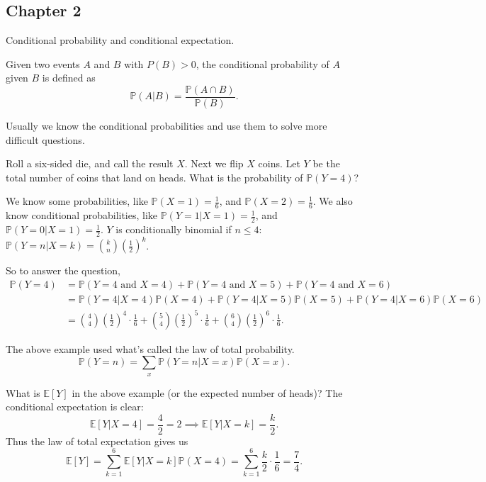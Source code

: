 \documentclass{article}
\newcommand{\PP}{\mathbb{P}}
\newcommand{\E}{\mathbb{E}}
\begin{document}
\subsection{Chapter 2}
Conditional probability and conditional expectation.
\begin{definition}
  Given two events \(A\) and \(B\) with \(P(B) > 0\), the conditional probability of \(A\) given \(B\) is defined as
  \[\PP(A|B) = \frac{\PP(A \cap B)}{\PP(B)}.\]
\end{definition}
Usually we know the conditional probabilities and use them to solve more difficult questions.
\begin{example}
  Roll a six-sided die, and call the result $X$. Next we flip $X$ coins. Let $Y$ be the total number of coins that land on heads. What is the probability of $\PP(Y=4)$?

  We know some probabilities, like $\PP(X=1) = \frac{1}{6}$, and $\PP(X=2) = \frac{1}{6}$. We also know conditional probabilities, like $\PP(Y=1|X=1) = \frac{1}{2}$, and $\PP(Y=0|X=1) = \frac{1}{2}$. $Y$ is conditionally binomial if $n\leq4$: $\PP(Y=n|X=k) = \binom{k}{n} \left(\frac{1}{2}\right)^k$.

  So to answer the question,
  \begin{align*}
    \PP(Y=4) &= \PP(Y=4 \text{ and } X=4) + \PP(Y=4 \text{ and } X=5) + \PP(Y=4 \text{ and } X=6) \\
    &= \PP(Y=4|X=4)\PP(X=4) + \PP(Y=4|X=5)\PP(X=5) + \PP(Y=4|X=6)\PP(X=6) \\
    &= \binom{4}{4}\left(\frac{1}{2}\right)^4 \cdot \frac{1}{6} + \binom{5}{4}\left(\frac{1}{2}\right)^5 \cdot \frac{1}{6} + \binom{6}{4}\left(\frac{1}{2}\right)^6 \cdot \frac{1}{6}.
  \end{align*}
\end{example}

\begin{definition}
  The above example used what's called the law of total probability.
  \[\PP(Y=n)=\sum_x \PP(Y=n|X=x)\PP(X=x).\]
\end{definition}

\begin{example}
  What is $\E[Y]$ in the above example (or the expected number of heads)? The conditional expectation is clear:
  \[\E[Y|X=4]=\frac{4}{2}=2\implies \E[Y|X=k]=\frac{k}{2}.\]
  Thus the law of total expectation gives us
  \[\E[Y]=\sum_{k=1}^6 \E[Y|X=k]\PP(X=4)=\sum_{k=1}^6 \frac{k}{2} \cdot \frac{1}{6} = \frac{7}{4}.\]
\end{example}
\end{document}
